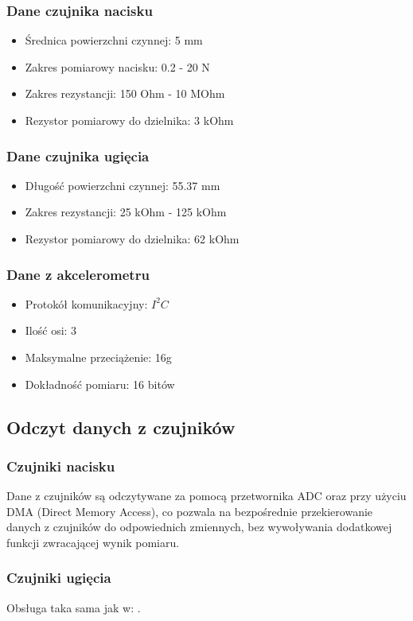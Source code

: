 \documentclass[12pt,a4paper]{article}
\begin{document}
\subsubsection{Dane czujnika nacisku}
\begin{itemize}
\item Średnica powierzchni czynnej: 5 mm
\item Zakres pomiarowy nacisku: 0.2 - 20 N
\item Zakres rezystancji: 150 Ohm - 10 MOhm
\item Rezystor pomiarowy do dzielnika: 3 kOhm
\end{itemize}
\subsubsection{Dane czujnika ugięcia}
\begin{itemize}
\item Długość powierzchni czynnej: 55.37 mm
\item Zakres rezystancji: 25 kOhm - 125 kOhm
\item Rezystor pomiarowy do dzielnika: 62 kOhm
\end{itemize}
\subsubsection{Dane z akcelerometru}
\begin{itemize}
\item Protokół komunikacyjny: $I^2C$
\item Ilość osi: 3
\item Maksymalne przeciążenie: 16g
\item Dokładność pomiaru: 16 bitów 
\end{itemize}
\subsection{Odczyt danych z czujników}
\subsubsection{Czujniki nacisku} \label{czujniki_nacisku}
Dane z czujników są odczytywane za pomocą przetwornika ADC oraz przy użyciu DMA (Direct Memory Access), co pozwala na bezpośrednie przekierowanie danych z czujników do odpowiednich zmiennych, bez wywoływania dodatkowej funkcji zwracającej wynik pomiaru.
\subsubsection{Czujniki ugięcia}
Obsługa taka sama jak w: .
\end{document}
